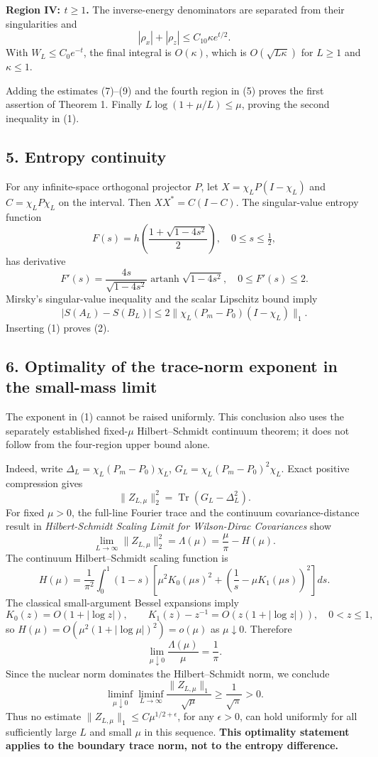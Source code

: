 \documentclass[
  10pt,
  a4paper,
]{article}
\begin{document}
\textbf{Region IV: \(t\ge1\).} The inverse-energy denominators are separated from their singularities and \[
 |\rho_x|+|\rho_z|\le C_{10}\kappa e^{t/2}.
\] With \(W_L\le C_0e^{-t}\), the final integral is \(O(\kappa)\), which is \(O(\sqrt{L\kappa})\) for \(L\ge1\) and \(\kappa\le1\).

Adding the estimates (7)--(9) and the fourth region in (5) proves the first assertion of Theorem 1. Finally \(L\log(1+\mu/L)\le\mu\), proving the second inequality in (1).

\subsection{5. Entropy continuity}\label{entropy-continuity}

For any infinite-space orthogonal projector \(P\), let \(X=\chi_LP(I-\chi_L)\) and \(C=\chi_LP\chi_L\) on the interval. Then \(XX^*=C(I-C)\). The singular-value entropy function \[
 F(s)=h\!\left(\frac{1+\sqrt{1-4s^2}}2\right),
 \quad 0\le s\le\tfrac12,
\] has derivative \[
 F'(s)=\frac{4s}{\sqrt{1-4s^2}}
       \operatorname{artanh}\sqrt{1-4s^2},\quad 0\le F'(s)\le2.
\] Mirsky's singular-value inequality and the scalar Lipschitz bound imply \[
 |S(A_L)-S(B_L)|\le2\|\chi_L(P_m-P_0)(I-\chi_L)\|_1.
\] Inserting (1) proves (2).

\subsection{6. Optimality of the trace-norm exponent in the small-mass limit}\label{optimality-of-the-trace-norm-exponent-in-the-small-mass-limit}

The exponent in (1) cannot be raised uniformly. This conclusion also uses the separately established fixed-\(\mu\) Hilbert--Schmidt continuum theorem; it does not follow from the four-region upper bound alone.

Indeed, write \(\Delta_L=\chi_L(P_m-P_0)\chi_L\), \(G_L=\chi_L(P_m-P_0)^2\chi_L\). Exact positive compression gives \[
 \|Z_{L,\mu}\|_2^2
 =\operatorname{Tr}(G_L-\Delta_L^2).
\] For fixed \(\mu>0\), the full-line Fourier trace and the continuum covariance-distance result in \emph{Hilbert-Schmidt Scaling Limit for Wilson-Dirac Covariances} show \[
 \lim_{L\to\infty}\|Z_{L,\mu}\|_2^2
 =\Lambda(\mu)=\frac\mu\pi-H(\mu).
\] The continuum Hilbert--Schmidt scaling function is \[
 H(\mu)=\frac1{\pi^2}\int_0^1(1-s)\left[
 \mu^2K_0(\mu s)^2+
 \left(\frac1s-\mu K_1(\mu s)\right)^2\right]ds.
\] The classical small-argument Bessel expansions imply \[
 K_0(z)=O(1+|\log z|),\qquad
 K_1(z)-z^{-1}=O(z(1+|\log z|)),\quad 0<z\le1,
\] so \(H(\mu)=O(\mu^2(1+|\log\mu|)^2)=o(\mu)\) as \(\mu\downarrow0\). Therefore \[
 \lim_{\mu\downarrow0}\frac{\Lambda(\mu)}\mu=\frac1\pi.
\] Since the nuclear norm dominates the Hilbert--Schmidt norm, we conclude \[
 \boxed{
 \liminf_{\mu\downarrow0}\liminf_{L\to\infty}
 \frac{\|Z_{L,\mu}\|_1}{\sqrt\mu}
 \ge\frac1{\sqrt\pi}>0.}\tag{10}
\] Thus no estimate \(\|Z_{L,\mu}\|_1\le C\mu^{1/2+\epsilon}\), for any \(\epsilon>0\), can hold uniformly for all sufficiently large \(L\) and small \(\mu\) in this sequence. \textbf{This optimality statement applies to the boundary trace norm, not to the entropy difference.}
\end{document}
